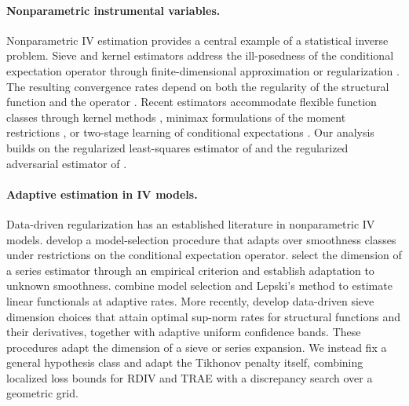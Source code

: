 \documentclass[12pt]{article}
\theoremstyle{plain}
\theoremstyle{definition}
\theoremstyle{remark}
\begin{document}
\paragraph{Nonparametric instrumental variables.}
Nonparametric IV estimation provides a central example of a statistical inverse problem. Sieve and kernel estimators address the ill-posedness of the conditional expectation operator through finite-dimensional approximation or regularization \citep{neweyInstrumentalVariableEstimation2003,hallNonparametricMethodsInference2005,darollesNonparametricInstrumentalRegression2011,chenEstimationNonparametricConditional2012}. The resulting convergence rates depend on both the regularity of the structural function and the operator \citep{chenRATEOPTIMALITYILLPOSED2011,florensIDENTIFICATIONESTIMATIONPENALIZATION2011}. Recent estimators accommodate flexible function classes through kernel methods \citep{singh2019kernel,muandet2020dual}, minimax formulations of the moment restrictions \citep{lewis2018adversarial,dikkala2020minimax,liao2020provably,bennett2023variational}, or two-stage learning of conditional expectations \citep{hartford2017deep,xu2021features,li2024regularized}. Our analysis builds on the regularized least-squares estimator of \citet{li2024regularized} and the regularized adversarial estimator of \citet{bennett2023source}.

\paragraph{Adaptive estimation in IV models.}
Data-driven regularization has an established literature in nonparametric IV models. \citet{johannes2011partially} develop a model-selection procedure that adapts over smoothness classes under restrictions on the conditional expectation operator. \citet{horowitz2014adaptive} select the dimension of a series estimator through an empirical criterion and establish adaptation to unknown smoothness. \citet{breunig2016adaptive} combine model selection and Lepski's method to estimate linear functionals at adaptive rates. More recently, \citet{chen2025adaptive} develop data-driven sieve dimension choices that attain optimal sup-norm rates for structural functions and their derivatives, together with adaptive uniform confidence bands. These procedures adapt the dimension of a sieve or series expansion. We instead fix a general hypothesis class and adapt the Tikhonov penalty itself, combining localized loss bounds for RDIV and TRAE \citep{li2024regularized,bennett2023source} with a discrepancy search over a geometric grid.
\end{document}
